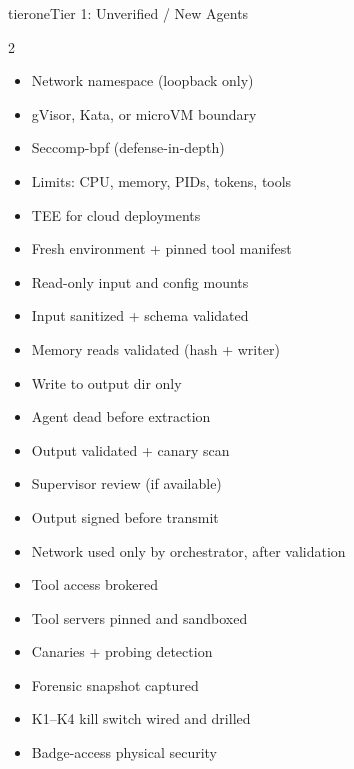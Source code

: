 \documentclass[11pt,letterpaper]{article}
\begin{document}
\begin{checkbox}{tierone}{Tier 1: Unverified / New Agents}
\small
\begin{multicols}{2}
\begin{itemize}[leftmargin=1.4em, itemsep=0.15em]
  \item[{\color{tierone!80!black}$\square$}] Network namespace (loopback only)
  \item[{\color{tierone!80!black}$\square$}] gVisor, Kata, or microVM boundary
  \item[{\color{tierone!80!black}$\square$}] Seccomp-bpf (defense-in-depth)
  \item[{\color{tierone!80!black}$\square$}] Limits: CPU, memory, PIDs, tokens, tools
  \item[{\color{tierone!80!black}$\square$}] TEE for cloud deployments
  \item[{\color{tierone!80!black}$\square$}] Fresh environment + pinned tool manifest
  \item[{\color{tierone!80!black}$\square$}] Read-only input and config mounts
  \item[{\color{tierone!80!black}$\square$}] Input sanitized + schema validated
  \item[{\color{tierone!80!black}$\square$}] Memory reads validated (hash + writer)
  \item[{\color{tierone!80!black}$\square$}] Write to output dir only
  \item[{\color{tierone!80!black}$\square$}] Agent dead before extraction
  \item[{\color{tierone!80!black}$\square$}] Output validated + canary scan
  \item[{\color{tierone!80!black}$\square$}] Supervisor review (if available)
  \item[{\color{tierone!80!black}$\square$}] Output signed before transmit
  \item[{\color{tierone!80!black}$\square$}] Network used only by orchestrator, after validation
\item[{\color{tierone!80!black}$\square$}] Tool access brokered
  \item[{\color{tierone!80!black}$\square$}] Tool servers pinned and sandboxed
  \item[{\color{tierone!80!black}$\square$}] Canaries + probing detection
  \item[{\color{tierone!80!black}$\square$}] Forensic snapshot captured
  \item[{\color{tierone!80!black}$\square$}] K1--K4 kill switch wired and drilled
  \item[{\color{tierone!80!black}$\square$}] Badge-access physical security
\end{itemize}
\end{multicols}
\end{checkbox}
\end{document}
